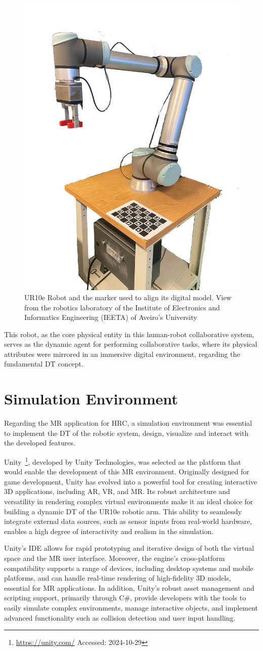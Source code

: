 \begin{figure}[h]
    \centering
    \includegraphics[width=0.35\linewidth]{figs/robot-marker.png}
    \caption{UR10e Robot and the marker used to align its digital model. View from the robotics laboratory of the Institute of Electronics and Informatics Engineering (IEETA) of Aveiro's University}
    \label{f:ur10e_iris}
\end{figure}


This robot, as the core physical entity in this human-robot collaborative system, serves as the dynamic agent for performing collaborative tasks, where its physical attributes were mirrored in an immersive digital environment, regarding the fundamental \ac{DT} concept.

\section{Simulation Environment}

Regarding the \ac{MR} application for \ac{HRC}, a simulation environment was essential to implement the \ac{DT} of the robotic system, design, 
visualize and interact with the developed features.

Unity~\footnote{\url{https://unity.com/} Accessed: 2024-10-29}, developed by Unity Technologies, was selected as the platform that would enable the development of this \ac{MR} environment. Originally designed for game development, Unity has evolved into a powerful tool for creating interactive 3D applications, including \ac{AR}, \ac{VR}, and \ac{MR}. Its robust architecture and versatility in rendering complex virtual environments make it an ideal choice for building a dynamic \ac{DT} of the UR10e robotic arm. This ability to seamlessly integrate external data sources, such as sensor inputs from real-world hardware, enables a high degree of interactivity and realism in the simulation.

Unity’s \ac{IDE} allows for rapid prototyping and iterative design of both the virtual space and the \ac{MR} user interface. Moreover, the engine's cross-platform compatibility supports a range of devices, including desktop systems and mobile platforms, and can handle real-time rendering of high-fidelity 3D models, essential for \ac{MR} applications. In addition, Unity’s robust asset management and scripting support, primarily through C\#, provide developers with the tools to easily simulate complex environments, manage interactive objects, and implement advanced functionality such as collision detection and user input handling.

